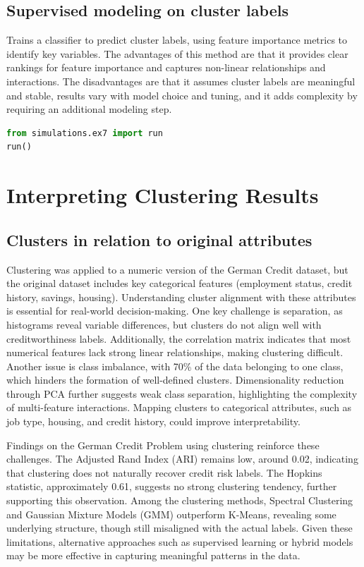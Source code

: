 \documentclass[11pt,a4paper]{article}
\begin{document}
\subsection{Supervised modeling on cluster labels}
Trains a classifier to predict cluster labels, using feature importance metrics to identify key variables. The advantages of this method are that it provides clear rankings for feature importance and captures non-linear relationships and interactions. The disadvantages are that it assumes cluster labels are meaningful and stable, results vary with model choice and tuning, and it adds complexity by requiring an additional modeling step.

\begin{lstlisting}[language=Python]
from simulations.ex7 import run 
run()
\end{lstlisting}

\section{Interpreting Clustering Results}
\subsection*{Clusters in relation to original attributes}
Clustering was applied to a numeric version of the German Credit dataset, but the original dataset includes key categorical features (employment status, credit history, savings, housing). Understanding cluster alignment with these attributes is essential for real-world decision-making. One key challenge is separation, as histograms reveal variable differences, but clusters do not align well with creditworthiness labels. Additionally, the correlation matrix indicates that most numerical features lack strong linear relationships, making clustering difficult. Another issue is class imbalance, with 70\% of the data belonging to one class, which hinders the formation of well-defined clusters. Dimensionality reduction through PCA further suggests weak class separation, highlighting the complexity of multi-feature interactions. Mapping clusters to categorical attributes, such as job type, housing, and credit history, could improve interpretability.

Findings on the German Credit Problem using clustering reinforce these challenges. The Adjusted Rand Index (ARI) remains low, around 0.02, indicating that clustering does not naturally recover credit risk labels. The Hopkins statistic, approximately 0.61, suggests no strong clustering tendency, further supporting this observation. Among the clustering methods, Spectral Clustering and Gaussian Mixture Models (GMM) outperform K-Means, revealing some underlying structure, though still misaligned with the actual labels. Given these limitations, alternative approaches such as supervised learning or hybrid models may be more effective in capturing meaningful patterns in the data.
\end{document}
